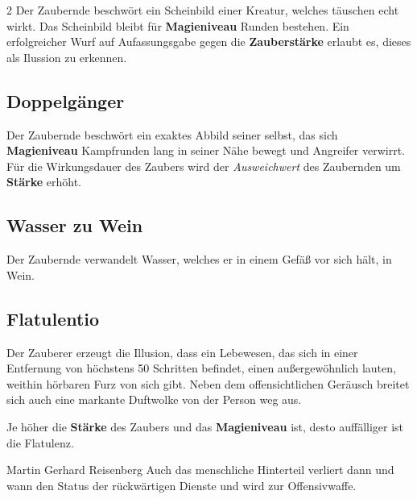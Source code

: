 \begin{multicols*}{2}
Der Zaubernde beschwört ein Scheinbild einer Kreatur, welches täuschen echt wirkt. Das Scheinbild bleibt für \textbf{Magieniveau} Runden bestehen. Ein erfolgreicher Wurf auf Aufassungsgabe gegen die \textbf{Zauberstärke} erlaubt es, dieses als Ilussion zu erkennen.



\subsection{Doppelgänger}

Der Zaubernde beschwört ein exaktes Abbild seiner selbst, das sich \textbf{Magieniveau} Kampfrunden lang in seiner Nähe bewegt und Angreifer verwirrt. Für die Wirkungsdauer des Zaubers wird der \textit{Ausweichwert} des Zaubernden um \textbf{Stärke} erhöht.



\subsection{Wasser zu Wein}

Der Zaubernde verwandelt Wasser, welches er in einem Gefäß vor sich hält, in Wein.



\subsection{Flatulentio}

Der Zauberer erzeugt die Illusion, dass ein Lebewesen, das sich in einer Entfernung von höchstens 50 Schritten befindet, einen außergewöhnlich lauten, weithin hörbaren Furz von sich gibt. Neben dem offensichtlichen Geräusch breitet sich auch eine markante Duftwolke von der Person weg aus.

Je höher die \textbf{Stärke} des Zaubers und das \textbf{Magieniveau} ist, desto auffälliger ist die Flatulenz.

\begin{pquote}{Martin Gerhard Reisenberg}
Auch das menschliche Hinterteil verliert dann und wann den Status der rückwärtigen Dienste und wird zur Offensivwaffe.
\end{pquote}


\end{multicols*}
